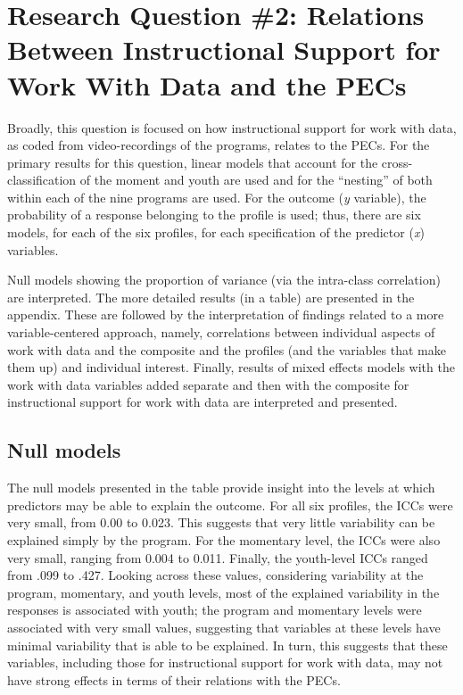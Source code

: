 \documentclass[]{msu-thesis}
\theoremstyle{definition}
\theoremstyle{definition}
\theoremstyle{definition}
\theoremstyle{remark}
\begin{document}
\section{Research Question \#2: Relations Between Instructional Support
for Work With Data and the
PECs}\label{research-question-2-relations-between-instructional-support-for-work-with-data-and-the-pecs}

Broadly, this question is focused on how instructional support for work
with data, as coded from video-recordings of the programs, relates to
the PECs. For the primary results for this question, linear models that
account for the cross-classification of the moment and youth are used
and for the ``nesting'' of both within each of the nine programs are
used. For the outcome (\emph{y} variable), the probability of a response
belonging to the profile is used; thus, there are six models, for each
of the six profiles, for each specification of the predictor (\emph{x})
variables.

Null models showing the proportion of variance (via the intra-class
correlation) are interpreted. The more detailed results (in a table) are
presented in the appendix. These are followed by the interpretation of
findings related to a more variable-centered approach, namely,
correlations between individual aspects of work with data and the
composite and the profiles (and the variables that make them up) and
individual interest. Finally, results of mixed effects models with the
work with data variables added separate and then with the composite for
instructional support for work with data are interpreted and presented.

\subsection{Null models}\label{null-models}

The null models presented in the table provide insight into the levels
at which predictors may be able to explain the outcome. For all six
profiles, the ICCs were very small, from 0.00 to 0.023. This suggests
that very little variability can be explained simply by the program. For
the momentary level, the ICCs were also very small, ranging from 0.004
to 0.011. Finally, the youth-level ICCs ranged from .099 to .427.
Looking across these values, considering variability at the program,
momentary, and youth levels, most of the explained variability in the
responses is associated with youth; the program and momentary levels
were associated with very small values, suggesting that variables at
these levels have minimal variability that is able to be explained. In
turn, this suggests that these variables, including those for
instructional support for work with data, may not have strong effects in
terms of their relations with the PECs.
\end{document}
